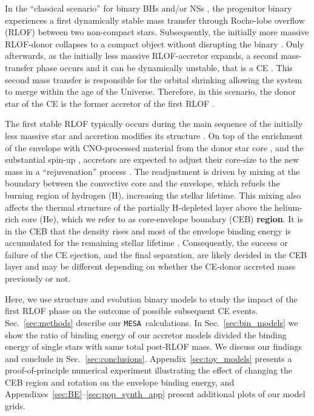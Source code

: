\documentclass[twocolumn,twocolappendix,trackchanges]{aastex63}
\newcommand{\code}[1]{\texttt{#1}}
\newcommand{\mesa}{\code{MESA}}
\DeclareRobustCommand{\Secref}[1]{Sec.~\ref{#1}}
\begin{document}
In the ``classical scenario'' for binary BHs and/or NSs
\citep[e.g.,][]{tutukov:93,belczynski:2016, tauris:2017}, the
progenitor binary experiences a first dynamically stable mass transfer
through Roche-lobe overflow (RLOF) between two non-compact stars.
Subsequently, the initially more massive RLOF-donor collapses to a
compact object without disrupting the binary
\citep[e.g.,][]{blaauw:1961,renzo:2019walk}. Only afterwards, as the
initially less massive RLOF-accretor expands, a second mass-transfer
phase occurs and it can be dynamically unstable, that is a CE
\citep[e.g.,][]{dominik:2012, belczynski:2016, kruckow:18}. This
second mass transfer is responsible for the orbital shrinking
\citep{paczynski:1976} allowing the system to merge within the age of
the Universe. Therefore, in this scenario, the donor star of the CE is
the former accretor of the first RLOF \citep[e.g.,][]{klencki:2020,
  law-smith:2020, renzo:2021zoph}.

The first stable RLOF typically occurs during the main sequence of the
initially less massive star and accretion modifies its structure
\citep[e.g.,][]{neo:1977, packet:1981, blaauw:1993, cantiello:2007,
  renzo:2021zoph}. On top of the enrichment of the envelope with
CNO-processed material from the donor star core \citep{blaauw:1993,
  renzo:2021zoph, el-badry:2022a}, and the substantial spin-up \citep[e.g.,][]{packet:1981},
accretors are expected to adjust their core-size to the new mass in a
``rejuvenation'' process \citep[e.g.,][]{neo:1977, hellings:1983,
  hellings:1984}. The readjustment is driven by mixing at the boundary
between the convective core and the envelope, which refuels the
burning region of hydrogen (H), increasing the stellar lifetime. This
mixing also affects the thermal structure of the partially H-depleted
layer above the helium-rich core (He), which we refer to as
core-envelope boundary (CEB) \textcolor{green!80!black}{\bf region}. It is in the CEB that the density
rises and most of the envelope binding energy is accumulated for the
remaining stellar lifetime \citep[e.g.,][]{tauris:01, ivanova:2013,
  ivanova:2020}. Consequently, the success or failure of the CE
ejection, and the final separation, are likely decided in the CEB
layer and may be different depending on whether the CE-donor accreted
mass previously or not.

Here, we use structure and evolution binary models to study the impact
of the first RLOF phase on the outcome of possible subsequent CE
events. \Secref{sec:methods} describe our \mesa\ calculations. In
\Secref{sec:bin_models} we show the ratio of binding energy of our
accretor models divided the binding energy of single stars with same
total post-RLOF mass. We discuss our findings and conclude in
\Secref{sec:conclusions}. Appendix~\ref{sec:toy_models} presents a
proof-of-principle numerical experiment illustrating the effect of
changing the CEB region and rotation on the envelope binding energy,
and Appendixes~\ref{sec:BE}--\ref{sec:pop_synth_app} present
additional plots of our model grids.
\end{document}
